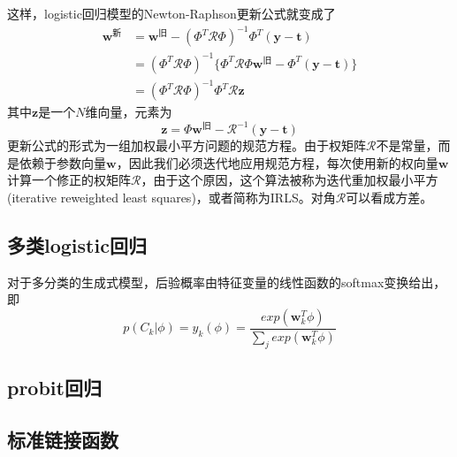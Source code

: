 这样，logistic回归模型的Newton-Raphson更新公式就变成了
\begin{equation}
	\begin{aligned}
	\boldsymbol{w}^{\text{新}}&=\boldsymbol{w}^{\text{旧}}-(\Phi^T\mathcal{R}\Phi)^{-1}\Phi^T(\boldsymbol{y}-\boldsymbol{t})\\
	&=(\Phi^T\mathcal{R}\Phi)^{-1}\{\Phi^T\mathcal{R}\Phi\boldsymbol{w}^{\text{旧}}- \Phi^T(\boldsymbol{y}-\boldsymbol{t})\}\\
	&=(\Phi^T\mathcal{R}\Phi)^{-1}\Phi^T\mathcal{R}\boldsymbol{z}
	\end{aligned}
\end{equation}
其中$\boldsymbol{z}$是一个$N$维向量，元素为
\begin{equation}
	\boldsymbol{z}=\Phi\boldsymbol{w}^{\text{旧}}-\mathcal{R}^{-1}(\boldsymbol{y}-\boldsymbol{t})
\end{equation}
更新公式的形式为一组加权最小平方问题的规范方程。由于权矩阵$\mathcal{R}$不是常量，而是依赖于参数向量$\boldsymbol{w}$，因此我们必须迭代地应用规范方程，每次使用新的权向量$\boldsymbol{w}$计算一个修正的权矩阵$\mathcal{R}$，由于这个原因，这个算法被称为迭代重加权最小平方(iterative reweighted least squares)，或者简称为IRLS。对角$\mathcal{R}$可以看成方差。
\subsection*{多类logistic回归}
对于多分类的生成式模型，后验概率由特征变量的线性函数的softmax变换给出，即
\begin{equation}
	p(C_k|\phi)=y_k(\phi)=\frac{exp(\boldsymbol{w}_k^T\phi)}{\sum_jexp(\boldsymbol{w}_k^T\phi)}
\end{equation}
\subsection*{probit回归}
\subsection*{标准链接函数}